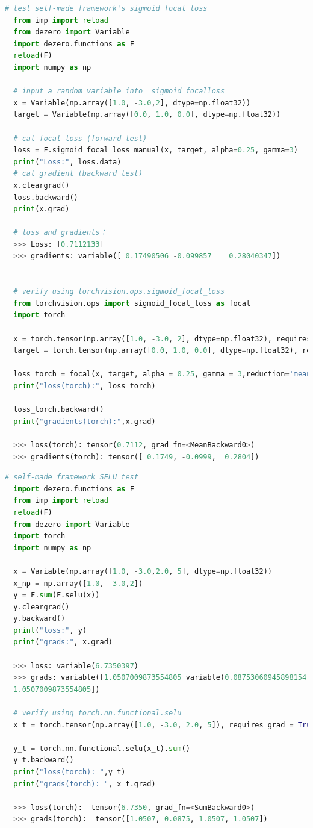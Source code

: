 \documentclass{article}
\begin{document}
\begin{lstlisting}[language=python]
  # test self-made framework's sigmoid focal loss
  from imp import reload
  from dezero import Variable
  import dezero.functions as F
  reload(F)
  import numpy as np

  # input a random variable into  sigmoid focalloss
  x = Variable(np.array([1.0, -3.0,2], dtype=np.float32))
  target = Variable(np.array([0.0, 1.0, 0.0], dtype=np.float32))

  # cal focal loss (forward test)
  loss = F.sigmoid_focal_loss_manual(x, target, alpha=0.25, gamma=3)
  print("Loss:", loss.data) 
  # cal gradient (backward test)
  x.cleargrad()
  loss.backward()
  print(x.grad)

  # loss and gradients：
  >>> Loss: [0.7112133]
  >>> gradients: variable([ 0.17490506 -0.099857    0.28040347])


  # verify using torchvision.ops.sigmoid_focal_loss
  from torchvision.ops import sigmoid_focal_loss as focal
  import torch

  x = torch.tensor(np.array([1.0, -3.0, 2], dtype=np.float32), requires_grad=True)
  target = torch.tensor(np.array([0.0, 1.0, 0.0], dtype=np.float32), requires_grad=False)

  loss_torch = focal(x, target, alpha = 0.25, gamma = 3,reduction='mean')
  print("loss(torch):", loss_torch)

  loss_torch.backward()
  print("gradients(torch):",x.grad)

  >>> loss(torch): tensor(0.7112, grad_fn=<MeanBackward0>)
  >>> gradients(torch): tensor([ 0.1749, -0.0999,  0.2804])
\end{lstlisting}

\begin{lstlisting}[language=python]
  # self-made framework SELU test
  import dezero.functions as F
  from imp import reload
  reload(F)
  from dezero import Variable
  import torch
  import numpy as np

  x = Variable(np.array([1.0, -3.0,2.0, 5], dtype=np.float32))
  x_np = np.array([1.0, -3.0,2])
  y = F.sum(F.selu(x))
  y.cleargrad()
  y.backward()
  print("loss:", y)
  print("grads:", x.grad)

  >>> loss: variable(6.7350397)
  >>> grads: variable([1.0507009873554805 variable(0.08753060945898154) 1.0507009873554805
  1.0507009873554805])

  # verify using torch.nn.functional.selu
  x_t = torch.tensor(np.array([1.0, -3.0, 2.0, 5]), requires_grad = True,  dtype = torch.float32)
  
  y_t = torch.nn.functional.selu(x_t).sum()
  y_t.backward()
  print("loss(torch): ",y_t)
  print("grads(torch): ", x_t.grad)

  >>> loss(torch):  tensor(6.7350, grad_fn=<SumBackward0>)
  >>> grads(torch):  tensor([1.0507, 0.0875, 1.0507, 1.0507])
\end{lstlisting}
\end{document}
